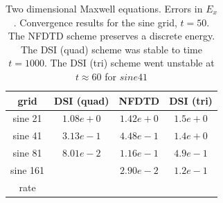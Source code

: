 \documentclass[10pt]{article}
\begin{document}
\begin{table}[hbt]
\begin{center}
\begin{tabular}{|c|c|c|c|} \hline 
  grid            &   DSI (quad) & NFDTD       &   DSI (tri)   \\   \hline\hline 
  sine 21         & $1.08e+0$   & $1.42e+0$  & $1.5e+0$     \\ 
  sine 41         & $3.13e-1$   & $4.48e-1$  & $1.4e+0$     \\ 
  sine 81         & $8.01e-2$   & $1.16e-1$  & $4.9e-1$     \\ 
  sine 161        & $        $  & $2.90e-2$  & $1.2e-1$     \\ 
   rate           &             &             &                \\ \hline
\end{tabular}
\end{center}
\caption{Two dimensional Maxwell equations. Errors in $E_x$. Convergence results for the sine grid, $t=50.$
       The NFDTD scheme preserves a discrete energy. The DSI (quad) scheme was stable to time $t=1000$.
        The DSI (tri) scheme went unstable at $t\approx 60$ for $sine 41$}
 \label{tab:sine chevron} 
\end{table}
\end{document}
